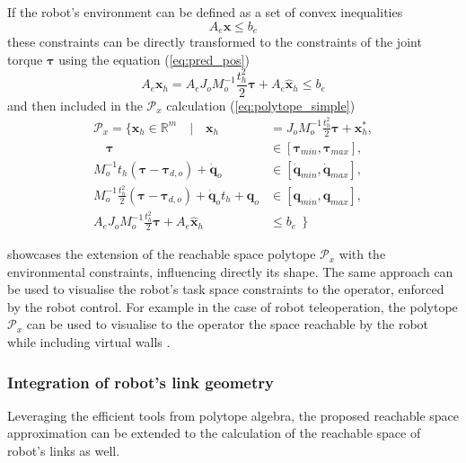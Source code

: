 If the robot's environment can be defined as a set of convex inequalities
\begin{equation}
    A_e \bm{x} \leq b_e
\end{equation}
these constraints can be directly transformed to the constraints of the joint torque $\bm{\tau}$ using the equation (\ref{eq:pred_pos})
\begin{equation}
    A_e\bm{x}_{h} = A_e J_o M_o^{-1}\frac{t_h^2}{2} \bm{\tau}  + A_e \hat{\bm{x}}_{h} \leq b_e
    \label{eq:env_limits}
\end{equation}
and then included in the $\mathcal{P}_x$ calculation (\ref{eq:polytope_simple})
\begin{equation}
\begin{split}
    \mathcal{P}_x= \{ \bm{x}_h \in \mathbb{R}^m \quad| \quad \bm{x}_h &= J_o M_o^{-1}\frac{t_h^2}{2}\bm{\tau} + \bm{x}^*_h,\\
   \quad \bm{\tau} &\in \left[\bm{\tau}_{min},\bm{\tau}_{max}\right],\\
    M_o^{-1}t_h (\bm{\tau} -\bm{\tau}_{d,o})+ \dot{\bm{q}}_o &\in \left[\dot{\bm{q}}_{min},\dot{\bm{q}}_{max}\right],\\
   M_o^{-1}\frac{t_h^2}{2}(\bm{\tau} -\bm{\tau}_{d,o}) +  \dot{\bm{q}}_ot_h + \bm{q}_o &\in \left[\bm{q}_{min},\bm{q}_{max}\right],\\
   A_e J_o M_o^{-1}\frac{t_h^2}{2} \bm{\tau}  + A_e \hat{\bm{x}}_{h} &\leq b_e ~~\}
\end{split} 
\label{eq:env}
\end{equation}

 showcases the extension of the reachable space polytope $\mathcal{P}_x$ with the environmental constraints, influencing directly its shape. The same approach can be used to visualise the robot's task space constraints to the operator, enforced by the robot control. For example in the case of robot teleoperation, the polytope $\mathcal{P}_x$ can be used to visualise to the operator the space reachable by the robot while including virtual walls \cite{Colgate1996Cobots}.




\subsubsection{Integration of robot's link geometry}

Leveraging the efficient tools from polytope algebra, the proposed reachable space approximation can be extended to the calculation of the reachable space of robot's links as well.


